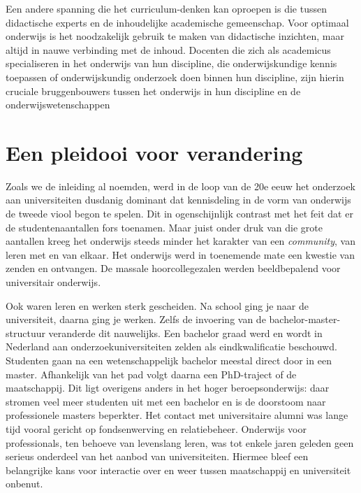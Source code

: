 \documentclass[smallauthor, chapterhaspagenum, nochapterinheader, pagenuminheader,  bigchapnum,medium2, tocpages, garamond, titleinheader]{jote-book}
\begin{document}
	Een andere spanning die het curriculum-denken kan oproepen is die tussen didactische experts en de inhoudelijke academische gemeenschap. Voor optimaal onderwijs is het noodzakelijk gebruik te maken van didactische inzichten, maar altijd in nauwe verbinding met de inhoud. Docenten die zich als academicus specialiseren in het onderwijs van hun discipline, die onderwijskundige kennis toepassen of onderwijskundig onderzoek doen binnen hun discipline, zijn hierin cruciale bruggenbouwers tussen het onderwijs in hun discipline en de onderwijswetenschappen



	\section{Een pleidooi voor verandering}



	Zoals we de inleiding al noemden, werd in de loop van de 20e eeuw het onderzoek aan universiteiten dusdanig dominant dat kennisdeling in de vorm van onderwijs de tweede viool begon te spelen. Dit in ogenschijnlijk contrast met het feit dat er de studentenaantallen fors toenamen. Maar juist onder druk van die grote aantallen kreeg het onderwijs steeds minder het karakter van een \emph{community}, van leren met en van elkaar. Het onderwijs werd in toenemende mate een kwestie van zenden en ontvangen. De massale hoorcollegezalen werden beeldbepalend voor universitair onderwijs.



	Ook waren leren en werken sterk gescheiden. Na school ging je naar de universiteit, daarna ging je werken. Zelfs de invoering van de bachelor-master-structuur veranderde dit nauwelijks. Een bachelor graad werd en wordt in Nederland aan onderzoekuniversiteiten zelden als eindkwalificatie beschouwd. Studenten gaan na een wetenschappelijk bachelor meestal direct door in een master. Afhankelijk van het pad volgt daarna een PhD-traject of de maatschappij. Dit ligt overigens anders in het hoger beroepsonderwijs: daar stromen veel meer studenten uit met een bachelor en is de doorstoom naar professionele masters beperkter. Het contact met universitaire alumni was lange tijd vooral gericht op fondsenwerving en relatiebeheer. Onderwijs voor professionals, ten behoeve van levenslang leren, was tot enkele jaren geleden geen serieus onderdeel van het aanbod van universiteiten. Hiermee bleef een belangrijke kans voor interactie over en weer tussen maatschappij en universiteit onbenut.
\end{document}
